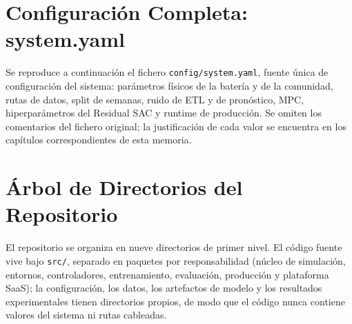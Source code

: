 \documentclass[12pt, a4paper, twoside]{report}
\begin{document}
\chapter{Configuración Completa: system.yaml}
\label{app:config}
Se reproduce a continuación el fichero \texttt{config/system.yaml}, fuente
única de configuración del sistema: parámetros físicos de la batería y de la
comunidad, rutas de datos, split de semanas, ruido de ETL y de pronóstico,
MPC, hiperparámetros del Residual SAC y runtime de producción. Se omiten los
comentarios del fichero original; la justificación de cada valor se encuentra
en los capítulos correspondientes de esta memoria.



\chapter{Árbol de Directorios del Repositorio}
\label{app:estructura}
El repositorio se organiza en nueve directorios de primer nivel. El código
fuente vive bajo \texttt{src/}, separado en paquetes por responsabilidad
(núcleo de simulación, entornos, controladores, entrenamiento, evaluación,
producción y plataforma SaaS); la configuración, los datos, los artefactos de
modelo y los resultados experimentales tienen directorios propios, de modo que
el código nunca contiene valores del sistema ni rutas cableadas.
\end{document}
